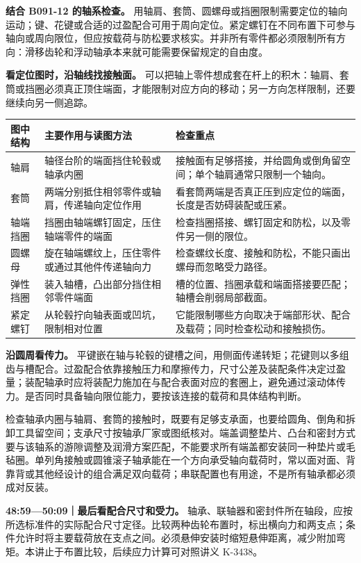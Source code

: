 \documentclass[zihao=5,a4paper,UTF8,fontset=fandol]{ctexart}
\begin{document}
\textbf{结合 B091-12 的轴系检查。} 用轴肩、套筒、圆螺母或挡圈限制需要定位的轴向运动；键、花键或合适的过盈配合可用于周向定位。紧定螺钉在不同布置下可参与轴向或周向限位，但应按载荷与防松要求核实。并非所有零件都必须限制所有方向：滑移齿轮和浮动轴承本来就可能需要保留规定的自由度。


\textbf{看定位图时，沿轴线找接触面。} 可以把轴上零件想成套在杆上的积木：轴肩、套筒或挡圈必须真正顶住端面，才能限制对应方向的移动；另一方向怎样限制，还要继续向另一侧追踪。


\begin{longtable}{p{4.86cm}p{4.86cm}p{4.86cm}}
\toprule
图中结构 & 主要作用与读图方法 & 检查重点 \\

\midrule
\endhead
轴肩 & 轴径台阶的端面挡住轮毂或轴承内圈 & 接触面有足够搭接，并给圆角或倒角留空间；单个轴肩通常只限制一个轴向。 \\
套筒 & 两端分别抵住相邻零件或轴肩，传递轴向定位作用 & 看套筒两端是否真正压到应定位的端面，长度是否妨碍装配或压紧。 \\
轴端挡圈 & 挡圈由轴端螺钉固定，压住轴端零件的端面 & 检查挡圈搭接、螺钉固定和防松，以及零件另一侧的限位。 \\
圆螺母 & 旋在轴端螺纹上，压住零件或通过其他件传递轴向力 & 检查螺纹长度、接触和防松，不能只画出螺母而忽略受力路径。 \\
弹性挡圈 & 装入轴槽，凸出部分挡住相邻零件端面 & 槽的位置、挡圈承载和端面搭接要匹配；轴槽会削弱局部截面。 \\
紧定螺钉 & 从轮毂拧向轴表面或凹坑，限制相对位置 & 它能限制哪些方向取决于端部形状、配合及载荷；同时检查松动和接触损伤。 \\
\bottomrule
\end{longtable}

\textbf{沿圆周看传力。} 平键嵌在轴与轮毂的键槽之间，用侧面传递转矩；花键则以多组齿与槽配合。过盈配合依靠接触压力和摩擦传力，尺寸公差及装配条件决定过盈量；装配轴承时应将装配力施加在与配合表面对应的套圈上，避免通过滚动体传力。是否同时具备轴向限位能力，要按该连接的载荷和具体结构判断。


检查轴承内圈与轴肩、套筒的接触时，既要有足够支承面，也要给圆角、倒角和拆卸工具留空间；支承尺寸按轴承厂家或图纸核对。端盖调整垫片、凸台和密封方式要与该轴系的游隙调整及润滑方案匹配，不能要求所有端盖都安装同一种垫片或毛毡圈。单列角接触或圆锥滚子轴承能在一个方向承受轴向载荷时，常以面对面、背靠背或其他经设计的组合满足双向载荷；串联配置也有用途，不是所有轴承都必须成对反装。


\textbf{48:59—50:09｜最后看配合尺寸和受力。} 轴承、联轴器和密封件所在轴段，应按所选标准件的实际配合尺寸定径。比较两种齿轮布置时，标出横向力和两支点；条件允许时将主要载荷放在支点之间。必须悬伸安装时缩短悬伸距离，减少附加弯矩。本讲止于布置比较，后续应力计算可对照讲义 K-3438。
\end{document}
